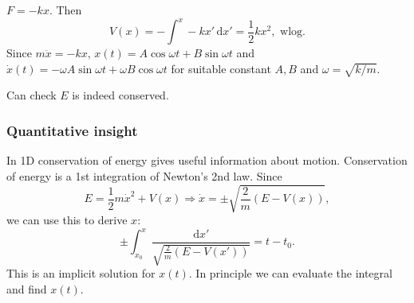 \begin{example}
    $ F=-kx $. Then 
    \[
        V(x) = - \int^{x} -kx' \,\mathrm{d}x' = \frac{1}{2}k x^2,\text{ wlog}.
    \]
    Since $ m \ddot{x} = -kx $, $ x(t) = A \cos \omega t+B \sin \omega t $ and $ \dot{x}(t) = -\omega A \sin \omega t+\omega B \cos \omega t $ for suitable constant $ A,B $ and $ \omega=\sqrt{k/m} $.

    Can check $E$ is indeed conserved.
\end{example}

\subsubsection{Quantitative insight}
In 1D conservation of energy gives useful information about motion. Conservation of energy is a 1st integration of Newton's 2nd law. Since 
\[
    E= \frac{1}{2}m \dot{x}^2 + V(x) \Longrightarrow \dot{x} = \pm \sqrt{\frac{2}{m}(E-V(x))},
\]
we can use this to derive $x$:
\[
    \pm \int_{x_0}^{x} \frac{\mathrm{d}x'}{\sqrt{\frac{2}{m}(E-V(x'))}} = t-t_0.
\]
This is an implicit solution for $x(t)$. In principle we can evaluate the integral and find $x(t)$.

